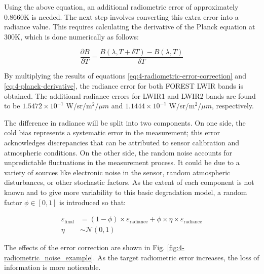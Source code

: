         Using the above equation, an additional radiometric error of approximately 0.8660K is needed. The next step involves converting this extra error into a radiance value. This requires calculating the derivative of the Planck equation at 300K, which is done numerically as follows:
        
        \begin{equation}
            \frac{\partial B}{\partial T} = \frac{B(\lambda, T + \delta T) - B(\lambda, T)}{\delta T}
            \label{eq:4-planck-derivative}
        \end{equation}  
        
        By multiplying the results of equations \ref{eq:4-radiometric-error-correction} and \ref{eq:4-planck-derivative}, the radiance error for both FOREST LWIR bands is obtained. The additional radiance errors for LWIR1 and LWIR2 bands are found to be \(1.5472 \times 10^{-1}\) W/sr/m\(^2\)/\(\mu m\) and \(1.1444 \times 10^{-1}\) W/sr/m\(^2\)/\(\mu m\), respectively.

        The difference in radiance will be split into two components. On one side, the cold bias represents a systematic error in the measurement; this error acknowledges discrepancies that can be attributed to sensor calibration and atmospheric conditions. On the other side, the random noise accounts for unpredictable fluctuations in the measurement process. It could be due to a variety of sources like electronic noise in the sensor, random atmospheric disturbances, or other stochastic factors. As the extent of each component is not known and to give more variability to this basic degradation model, a random factor $\phi \in [0,1] $ is introduced so that:

        \begin{equation}
        \begin{aligned}
            \varepsilon_{\text{final}} &= (1 - \phi) \times \varepsilon_{\text{radiance}} + \phi \times \eta \times \varepsilon_{\text{radiance}} \\
            \eta & \sim \mathcal{N} (0,1)
        \end{aligned}
        \end{equation}    

        The effects of the error correction are shown in Fig. \ref{fig:4-radiometric_noise_example}. As the target radiometric error increases, the loss of information is more noticeable.


